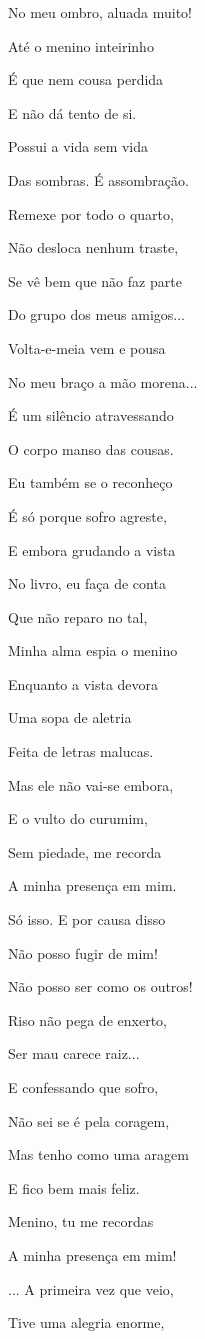 No meu ombro, aluada muito!

Até o menino inteirinho

É que nem cousa perdida

E não dá tento de si.

Possui a vida sem vida

Das sombras. É assombração.

Remexe por todo o quarto,

Não desloca nenhum traste,

Se vê bem que não faz parte

Do grupo dos meus amigos...

Volta-e-meia vem e pousa

No meu braço a mão morena...

É um silêncio atravessando

O corpo manso das cousas.

Eu também se o reconheço

É só porque sofro agreste,

E embora grudando a vista

No livro, eu faça de conta

Que não reparo no tal,

Minha alma espia o menino

Enquanto a vista devora

Uma sopa de aletria

Feita de letras malucas.

Mas ele não vai-se embora,

E o vulto do curumim,

Sem piedade, me recorda

A minha presença em mim.

Só isso. E por causa disso

Não posso fugir de mim!

Não posso ser como os outros!

Riso não pega de enxerto,

Ser mau carece raiz...

E confessando que sofro,

Não sei se é pela coragem,

Mas tenho como uma aragem

E fico bem mais feliz.

Menino, tu me recordas

A minha presença em mim!

... A primeira vez que veio,

Tive uma alegria enorme,

